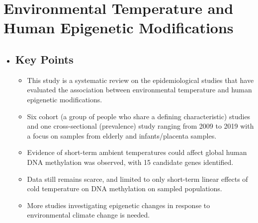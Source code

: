 \documentclass[plain, basic]{inVerba-notes}
\begin{document}
\section{\large{Environmental Temperature and Human Epigenetic Modifications}}
\begin{itemize}
  \item []
  \subsection{Key Points}
  \begin{itemize}
      \item This study is a systematic review on the epidemiological studies that have evaluated the association between environmental temperature and human epigenetic modifications.
      \item Six cohort (a group of people who share a defining characteristic) studies and one cross-sectional (prevalence) study ranging from 2009 to 2019 with a focus on samples from elderly and infants/placenta samples.
      \item Evidence of short-term ambient temperatures could affect global human DNA methylation was observed, with 15 candidate genes identified.
      \item Data still remains scarce, and limited to only short-term linear effects of cold temperature on DNA methylation on sampled populations.
      \item More studies investigating epigenetic changes in response to environmental climate change is needed.
  \end{itemize}


\end{itemize}
\end{document}
